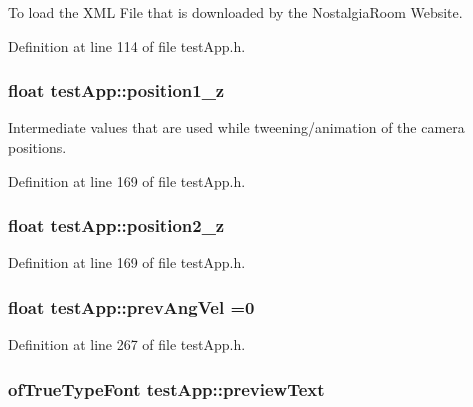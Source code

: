 To load the X\-M\-L File that is downloaded by the Nostalgia\-Room Website. 



Definition at line 114 of file test\-App.\-h.

\hypertarget{classtest_app_a808376783cdf510335cd1b37026e9bb3}{
\subsubsection[{position1\-\_\-z}]{\setlength{\rightskip}{0pt plus 5cm}float test\-App\-::position1\-\_\-z}}\label{classtest_app_a808376783cdf510335cd1b37026e9bb3}


Intermediate values that are used while tweening/animation of the camera positions. 



Definition at line 169 of file test\-App.\-h.

\hypertarget{classtest_app_a0720011cfaade6388109232ea4927c19}{
\subsubsection[{position2\-\_\-z}]{\setlength{\rightskip}{0pt plus 5cm}float test\-App\-::position2\-\_\-z}}\label{classtest_app_a0720011cfaade6388109232ea4927c19}


Definition at line 169 of file test\-App.\-h.

\hypertarget{classtest_app_a8a2b9b9cf76097e20f148b616297029b}{
\subsubsection[{prev\-Ang\-Vel}]{\setlength{\rightskip}{0pt plus 5cm}float test\-App\-::prev\-Ang\-Vel =0}}\label{classtest_app_a8a2b9b9cf76097e20f148b616297029b}


Definition at line 267 of file test\-App.\-h.

\hypertarget{classtest_app_af5b1af55af2256ef3751de075fc7a9cc}{
\subsubsection[{preview\-Text}]{\setlength{\rightskip}{0pt plus 5cm}of\-True\-Type\-Font test\-App\-::preview\-Text}}\label{classtest_app_af5b1af55af2256ef3751de075fc7a9cc}


